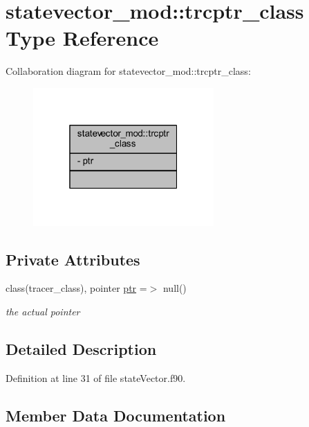 \hypertarget{structstatevector__mod_1_1trcptr__class}{}\section{statevector\+\_\+mod\+:\+:trcptr\+\_\+class Type Reference}
\label{structstatevector__mod_1_1trcptr__class}


Collaboration diagram for statevector\+\_\+mod\+:\+:trcptr\+\_\+class\+:\nopagebreak
\begin{figure}[H]
\begin{center}
\leavevmode
\includegraphics[width=196pt]{structstatevector__mod_1_1trcptr__class__coll__graph}
\end{center}
\end{figure}
\subsection*{Private Attributes}
\begin{DoxyCompactItemize}
\item 
class(tracer\+\_\+class), pointer \mbox{\hyperlink{structstatevector__mod_1_1trcptr__class_a1d7a04c6843655cbf92923320b3f2c37}{ptr}} =$>$ null()
\begin{DoxyCompactList}\small\item\em the actual pointer \end{DoxyCompactList}\end{DoxyCompactItemize}


\subsection{Detailed Description}


Definition at line 31 of file state\+Vector.\+f90.



\subsection{Member Data Documentation}
\mbox{\label{structstatevector__mod_1_1trcptr__class_a1d7a04c6843655cbf92923320b3f2c37}} 
